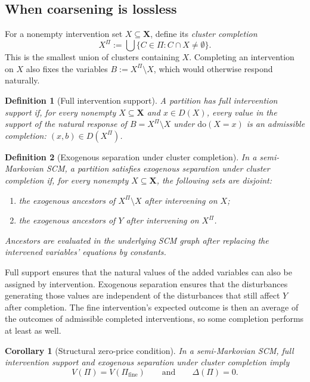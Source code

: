 \documentclass[twoside]{article}
\newtheorem{definition}{Definition}
\newtheorem{corollary}{Corollary}
\newcommand{\doo}{\mathrm{do}}
\begin{document}
\subsection{When coarsening is lossless}
\label{sec:zero-price}

For a nonempty intervention set \(X\subseteq\mathbf X\), define its
\emph{cluster completion}
\[
X^\Pi:=\bigcup\{C\in\Pi:C\cap X\ne\emptyset\}.
\]
This is the smallest union of clusters containing \(X\).
Completing an intervention on \(X\) also fixes the variables
\(B:=X^\Pi\setminus X\), which would otherwise respond naturally.

\begin{definition}[Full intervention support]
\label{def:full-support}
A partition has full intervention support if, for every nonempty
\(X\subseteq\mathbf X\) and \(x\in D(X)\), every value in the support
of the natural response of \(B=X^\Pi\setminus X\) under
\(\doo(X=x)\) is an admissible completion: \((x,b)\in D(X^\Pi)\).
\end{definition}

\begin{definition}[Exogenous separation under cluster completion]
\label{def:ccc}
In a semi-Markovian SCM, a partition satisfies exogenous separation
under cluster completion if, for every nonempty
\(X\subseteq\mathbf X\), the following sets are disjoint:
\begin{enumerate}[label=(\roman*),leftmargin=1.6em,itemsep=2pt,topsep=2pt]
\item the exogenous ancestors of \(X^\Pi\setminus X\) after
intervening on \(X\);
\item the exogenous ancestors of \(Y\) after intervening on
\(X^\Pi\).
\end{enumerate}
Ancestors are evaluated in the underlying SCM graph after replacing
the intervened variables' equations by constants.
\end{definition}

Full support ensures that the natural values of the added variables
can also be assigned by intervention. Exogenous separation ensures
that the disturbances generating those values are independent of the
disturbances that still affect \(Y\) after completion. The fine
intervention's expected outcome is then an average of the outcomes
of admissible completed interventions, so some completion performs
at least as well.

\begin{corollary}[Structural zero-price condition]
\label{cor:zero-price}
In a semi-Markovian SCM, full intervention support and exogenous
separation under cluster completion imply
\[
V(\Pi)=V(\Pi_{\mathrm{fine}})
\qquad\text{and}\qquad
\Delta(\Pi)=0.
\]
\end{corollary}
\end{document}
